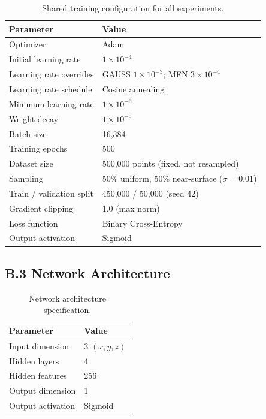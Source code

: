 \begin{table}[htbp]
\centering
\caption{Shared training configuration for all experiments.}
\label{tab:training_config}
\begin{tabular}{ll}
\toprule
\textbf{Parameter} & \textbf{Value} \\
\midrule
Optimizer & Adam \\
Initial learning rate & $1 \times 10^{-4}$ \\
Learning rate overrides & GAUSS $1 \times 10^{-3}$; MFN $3 \times 10^{-4}$ \\
Learning rate schedule & Cosine annealing \\
Minimum learning rate & $1 \times 10^{-6}$ \\
Weight decay & $1 \times 10^{-5}$ \\
Batch size & 16,384 \\
Training epochs & 500 \\
Dataset size & 500,000 points (fixed, not resampled) \\
Sampling & 50\% uniform, 50\% near-surface ($\sigma = 0.01$) \\
Train / validation split & 450,000 / 50,000 (seed 42) \\
Gradient clipping & 1.0 (max norm) \\
Loss function & Binary Cross-Entropy \\
Output activation & Sigmoid \\
\bottomrule
\end{tabular}
\end{table}

\subsection*{B.3 Network Architecture}

\begin{table}[htbp]
\centering
\caption{Network architecture specification.}
\label{tab:network_arch}
\begin{tabular}{ll}
\toprule
\textbf{Parameter} & \textbf{Value} \\
\midrule
Input dimension & 3 $(x, y, z)$ \\
Hidden layers & 4 \\
Hidden features & 256 \\
Output dimension & 1 \\
Output activation & Sigmoid \\
\bottomrule
\end{tabular}
\end{table}

